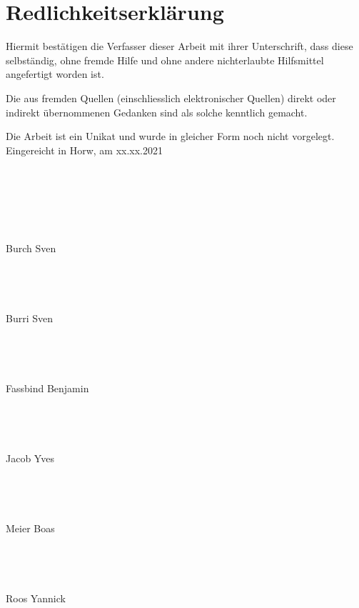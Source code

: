 \newpage
\section*{Redlichkeitserklärung}
\thispagestyle{empty}

 
Hiermit bestätigen die Verfasser dieser Arbeit mit ihrer Unterschrift, dass diese selbständig, ohne fremde Hilfe und ohne andere nichterlaubte Hilfsmittel angefertigt worden ist. 

 

Die aus fremden Quellen (einschliesslich elektronischer Quellen) direkt oder indirekt übernommenen Gedanken sind als solche kenntlich gemacht. 

 

Die Arbeit ist ein Unikat und wurde in gleicher Form noch nicht vorgelegt.\\

 

Eingereicht in Horw, am xx.xx.2021
\\
\\
\\
\\
\\
\\
\\
Burch Sven
\\
\\
\\
\\
\\
Burri Sven
\\
\\
\\
\\
\\
Fassbind Benjamin
\\
\\
\\
\\
\\
Jacob Yves
\\
\\
\\
\\
\\
Meier Boas
\\
\\
\\
\\
\\
Roos Yannick